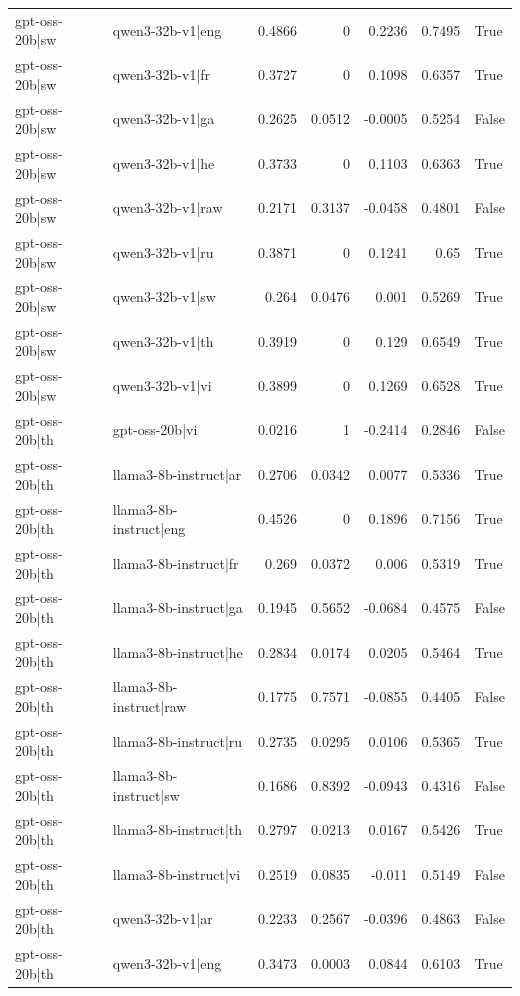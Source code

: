 \begin{table}
\begin{tabular}{l l r r r r l}
gpt-oss-20b|sw & qwen3-32b-v1|eng & 0.4866 & 0 & 0.2236 & 0.7495 & True \\
gpt-oss-20b|sw & qwen3-32b-v1|fr & 0.3727 & 0 & 0.1098 & 0.6357 & True \\
gpt-oss-20b|sw & qwen3-32b-v1|ga & 0.2625 & 0.0512 & -0.0005 & 0.5254 & False \\
gpt-oss-20b|sw & qwen3-32b-v1|he & 0.3733 & 0 & 0.1103 & 0.6363 & True \\
gpt-oss-20b|sw & qwen3-32b-v1|raw & 0.2171 & 0.3137 & -0.0458 & 0.4801 & False \\
gpt-oss-20b|sw & qwen3-32b-v1|ru & 0.3871 & 0 & 0.1241 & 0.65 & True \\
gpt-oss-20b|sw & qwen3-32b-v1|sw & 0.264 & 0.0476 & 0.001 & 0.5269 & True \\
gpt-oss-20b|sw & qwen3-32b-v1|th & 0.3919 & 0 & 0.129 & 0.6549 & True \\
gpt-oss-20b|sw & qwen3-32b-v1|vi & 0.3899 & 0 & 0.1269 & 0.6528 & True \\
gpt-oss-20b|th & gpt-oss-20b|vi & 0.0216 & 1 & -0.2414 & 0.2846 & False \\
gpt-oss-20b|th & llama3-8b-instruct|ar & 0.2706 & 0.0342 & 0.0077 & 0.5336 & True \\
gpt-oss-20b|th & llama3-8b-instruct|eng & 0.4526 & 0 & 0.1896 & 0.7156 & True \\
gpt-oss-20b|th & llama3-8b-instruct|fr & 0.269 & 0.0372 & 0.006 & 0.5319 & True \\
gpt-oss-20b|th & llama3-8b-instruct|ga & 0.1945 & 0.5652 & -0.0684 & 0.4575 & False \\
gpt-oss-20b|th & llama3-8b-instruct|he & 0.2834 & 0.0174 & 0.0205 & 0.5464 & True \\
gpt-oss-20b|th & llama3-8b-instruct|raw & 0.1775 & 0.7571 & -0.0855 & 0.4405 & False \\
gpt-oss-20b|th & llama3-8b-instruct|ru & 0.2735 & 0.0295 & 0.0106 & 0.5365 & True \\
gpt-oss-20b|th & llama3-8b-instruct|sw & 0.1686 & 0.8392 & -0.0943 & 0.4316 & False \\
gpt-oss-20b|th & llama3-8b-instruct|th & 0.2797 & 0.0213 & 0.0167 & 0.5426 & True \\
gpt-oss-20b|th & llama3-8b-instruct|vi & 0.2519 & 0.0835 & -0.011 & 0.5149 & False \\
gpt-oss-20b|th & qwen3-32b-v1|ar & 0.2233 & 0.2567 & -0.0396 & 0.4863 & False \\
gpt-oss-20b|th & qwen3-32b-v1|eng & 0.3473 & 0.0003 & 0.0844 & 0.6103 & True \\

\end{tabular}
\end{table}
